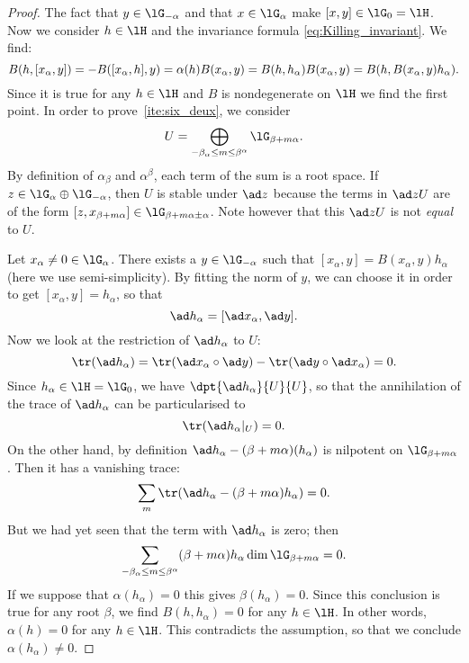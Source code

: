 \begin{proof}
The fact that $y\in\lG_{-\alpha}$ and that $x\in\lG_{\alpha}$ make $[x,y]\in\lG_0=\lH$. Now we consider $h\in\lH$ and the invariance formula \eqref{eq:Killing_invariant}. We find:
\begin{equation}
B(h,[x_{\alpha},y])=-B([x_{\alpha},h],y)\\
        =\alpha(h)B(x_{\alpha},y)\\
        =B(h,h_{\alpha})B(x_{\alpha},y)\\
        =B(h,B(x_{\alpha},y)h_{\alpha}).
\end{equation}
Since it is true for any $h\in\lH$ and $B$ is nondegenerate on $\lH$ we find the first point. In order to prove~\ref{ite:six_deux}, we consider
\[
U=\bigoplus_{-\beta_{\alpha}\leq m\leq\beta^{\alpha}}\lG_{\beta+m\alpha}.
\]
By definition of $\alpha_{\beta}$ and $\alpha^{\beta}$, each term of the sum is a root space. If $z\in\lG_{\alpha}\oplus\lG_{-\alpha}$, then $U$ is stable under $\ad z$ because the terms in $\ad z U$ are of the form $[z,x_{\beta+m\alpha}]\in\lG_{\beta+m\alpha\pm\alpha}$. Note however that this $\ad z U$ is not \emph{equal} to $U$.

Let $x_{\alpha}\neq 0\in\lG_{\alpha}$. There exists a $y\in\lG_{-\alpha}$ such that $[x_{\alpha},y]=B(x_{\alpha},y)h_{\alpha}$ (here we use semi-simplicity). By fitting the norm of $y$, we can choose it in order to get  $[x_{\alpha},y]=h_{\alpha}$, so that
\[
\ad h_{\alpha}=[\ad x_{\alpha},\ad y].
\]
Now we look at the restriction of $\ad h_{\alpha}$ to $U$:
\begin{equation}
\tr(\ad h_{\alpha})=\tr(\ad x_{\alpha}\circ\ad y)-\tr(\ad y\circ\ad x_{\alpha})=0.
\end{equation}
Since $h_{\alpha}\in\lH=\lG_0$, we have $\dpt{\ad h_{\alpha}}{U}{U}$, so that the annihilation of the trace of $\ad h_{\alpha}$ can be particularised to
\[
\tr(\ad h_{\alpha}|_U)=0.
\]
On the other hand, by definition $\ad h_{\alpha}-(\beta+m\alpha)(h_{\alpha})$ is nilpotent on $\lG_{\beta+m\alpha}$. Then it has a vanishing trace:
\[
\sum_m\tr( \ad h_{\alpha}-(\beta+m\alpha)h_{\alpha}  )=0.
\]
But we had yet seen that the term with $\ad h_{\alpha}$ is zero; then
\begin{equation}\label{eq:trace_U}
\sum_{-\beta_{\alpha}\leq m\leq \beta^{\alpha}} (\beta+m\alpha)h_{\alpha}\dim\lG_{\beta+m\alpha}=0.
\end{equation}
If we suppose that $\alpha(h_{\alpha})=0$ this gives $\beta(h_{\alpha})=0$. Since this conclusion is true for any root $\beta$, we find $B(h,h_{\alpha})=0$ for any $h\in\lH$. In other words, $\alpha(h)=0$ for any $h\in\lH$. This contradicts the assumption, so that we conclude $\alpha(h_{\alpha})\neq 0$.



\end{proof}
